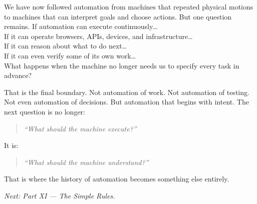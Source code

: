 \documentclass[11pt,twoside]{book}
\begin{document}
We have now followed automation from machines that repeated physical motions to machines that can interpret goals and choose actions.
But one question remains.
If automation can execute continuously\dots \\
If it can operate browsers, APIs, devices, and infrastructure\dots \\
If it can reason about what to do next\dots \\
If it can even verify some of its own work\dots \\
What happens when the machine no longer needs us to specify every task in advance?

That is the final boundary.
Not automation of work.
Not automation of testing.
Not even automation of decisions.
But automation that begins with intent.
The next question is no longer:
\begin{quote}
\emph{``What should the machine execute?''}
\end{quote}
It is:
\begin{quote}
\emph{``What should the machine understand?''}
\end{quote}

That is where the history of automation becomes something else entirely.

\begin{center}
\vspace{1em}
\textit{Next: Part XI — The Simple Rules.}
\end{center}
\end{document}
